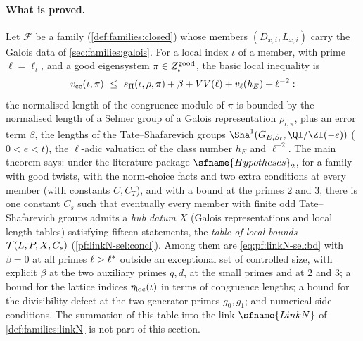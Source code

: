 \paragraph{What is proved.}
Let $\mathcal F$ be a family (\cref{def:families:closed}) whose members $(D_{x,i},L_{x,i})$ carry the Galois data of
\cref{sec:families:galois}. For a local index $\iota$ of a member, with prime $\ell=\ell_\iota$, and a good eigensystem
$\pi\in Z^{\mathrm{good}}_\iota$, the basic local inequality is
\begin{equation}\label{eq:pf:linkN-sel:bd}
\linkNselvcc(\iota,\pi)\ \le\ \linkNselsP(\iota,\rho,\pi)+\beta+VV(\ell)+v_\ell(h_E)+\ell^{-2}:
\end{equation}
the normalised length of the congruence module of $\pi$ is bounded by the normalised length of a Selmer group of a Galois
representation $\rho_{\iota,\pi}$, plus an error term $\beta$, the lengths of the Tate--Shafarevich groups
$\Sha^1(G_{E,S_\ell},\Ql/\Zl(-e))$ ($0<e<t$), the $\ell$-adic valuation of the class number $h_E$ and $\ell^{-2}$. The main theorem
says: under the literature package $\sfname{Hypotheses}_2$, for a family with good twists, with the norm-choice facts and two extra
conditions at every member (with constants $C,C_T$), and with a bound at the primes $2$ and $3$, there is one constant $C_s$ such
that eventually every member with finite odd Tate--Shafarevich groups admits a \emph{hub datum} $X$ (Galois representations and
local length tables) satisfying fifteen statements, the \emph{table of local bounds} $\mathcal T(L,P,X,C_s)$
(\cref{pf:linkN-sel:concl}). Among them are \eqref{eq:pf:linkN-sel:bd} with $\beta=0$ at all primes $\ell>\ell^{*}$ outside an
exceptional set of controlled size, with explicit $\beta$ at the two auxiliary primes $q,d$, at the small primes and at $2$ and $3$;
a bound for the lattice indices $\eta_{\mathrm{loc}}(\iota)$ in terms of congruence lengths; a bound for the divisibility defect at the two
generator primes $g_0,g_1$; and numerical side conditions. The summation of this table into the link $\sfname{LinkN}$ of
\cref{def:families:linkN} is not part of this section.

